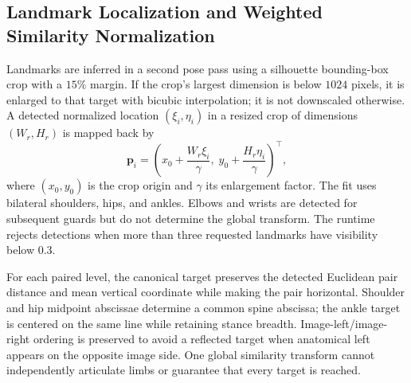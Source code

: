 \documentclass[journal]{IEEEtran}
\begin{document}
\subsection{Landmark Localization and Weighted Similarity Normalization}
\label{subsec:procrustes}
Landmarks are inferred in a second pose pass using a silhouette bounding-box crop with a $15\%$ margin. If the crop's largest dimension is below $1024$ pixels, it is enlarged to that target with bicubic interpolation; it is not downscaled otherwise. A detected normalized location $(\xi_i,\eta_i)$ in a resized crop of dimensions $(W_r,H_r)$ is mapped back by
\begin{equation}
\mathbf p_i=\left(x_0+\frac{W_r\xi_i}{\gamma},\;y_0+\frac{H_r\eta_i}{\gamma}\right)^\top,
\end{equation}
where $(x_0,y_0)$ is the crop origin and $\gamma$ its enlargement factor. The fit uses bilateral shoulders, hips, and ankles. Elbows and wrists are detected for subsequent guards but do not determine the global transform. The runtime rejects detections when more than three requested landmarks have visibility below $0.3$.

For each paired level, the canonical target preserves the detected Euclidean pair distance and mean vertical coordinate while making the pair horizontal. Shoulder and hip midpoint abscissae determine a common spine abscissa; the ankle target is centered on the same line while retaining stance breadth. Image-left/image-right ordering is preserved to avoid a reflected target when anatomical left appears on the opposite image side. One global similarity transform cannot independently articulate limbs or guarantee that every target is reached.
\end{document}
